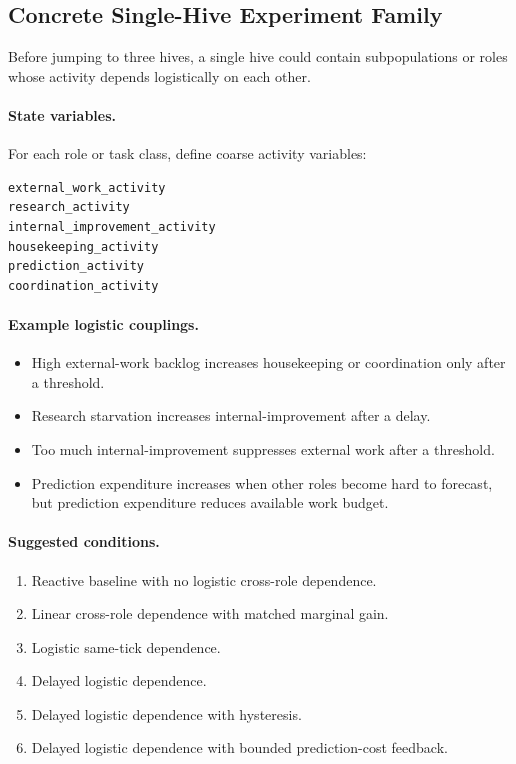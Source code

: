 \documentclass[11pt]{article}
\begin{document}
\subsection{Concrete Single-Hive Experiment Family}

Before jumping to three hives, a single hive could contain subpopulations or
roles whose activity depends logistically on each other.

\paragraph{State variables.}
For each role or task class, define coarse activity variables:

\begin{verbatim}
external_work_activity
research_activity
internal_improvement_activity
housekeeping_activity
prediction_activity
coordination_activity
\end{verbatim}

\paragraph{Example logistic couplings.}

\begin{itemize}
\item High external-work backlog increases housekeeping or coordination only
after a threshold.
\item Research starvation increases internal-improvement after a delay.
\item Too much internal-improvement suppresses external work after a threshold.
\item Prediction expenditure increases when other roles become hard to
forecast, but prediction expenditure reduces available work budget.
\end{itemize}

\paragraph{Suggested conditions.}

\begin{enumerate}
\item Reactive baseline with no logistic cross-role dependence.
\item Linear cross-role dependence with matched marginal gain.
\item Logistic same-tick dependence.
\item Delayed logistic dependence.
\item Delayed logistic dependence with hysteresis.
\item Delayed logistic dependence with bounded prediction-cost feedback.
\end{enumerate}
\end{document}

